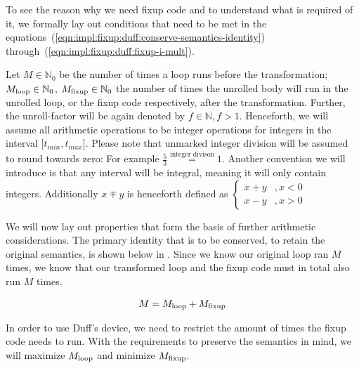 To see the reason why we need fixup code and to understand what is required of it, we formally lay out conditions that need to be met in the equations~(\ref{eqn:impl:fixup:duff:conserve-semantics-identity}) through~(\ref{eqn:impl:fixup:duff:fixup-i-mult}).

Let $M \in \mathbb{N}_0$ be the number of times a loop runs before the transformation; $M_{\text{loop}} \in \mathbb{N}_0$, $M_{\text{fixup}} \in \mathbb{N}_0$ the number of times the unrolled body will run in the unrolled loop, or the fixup code respectively, after the transformation.
Further, the unroll-factor will be again denoted by $f \in \mathbb{N}, f > 1$.
Henceforth, we will assume all arithmetic operations to be integer operations for integers in the interval $\lbrack t_{min}, t_{max} \rbrack$.
Please note that unmarked integer division will be assumed to round towards zero: For example $\frac{5}{3} \overset{\text{integer divison}}{=} 1$.
Another convention we will introduce is that any interval will be integral, meaning it will only contain integers.
Additionally $x \mp y$ is henceforth defined as
$\begin{cases}
     x + y &, x < 0\\
     x - y &, x > 0
\end{cases}$

We will now lay out properties that form the basis of further arithmetic considerations.
The primary identity that is to be conserved, to retain the original semantics, is shown below in .
Since we know our original loop ran $M$ times, we know that our transformed loop and the fixup code must in total also run $M$ times.

\begin{equation}\label{eqn:impl:fixup:duff:conserve-semantics-identity}
\begin{aligned}
    M = M_{\text{loop}} + M_{\text{fixup}}
\end{aligned}
\end{equation}

In order to use Duff's device, we need to restrict the amount of times the fixup code needs to run.
With the requirements to preserve the semantics in mind, we will maximize $M_{\text{loop}}$ and minimize $M_{\text{fixup}}$.

